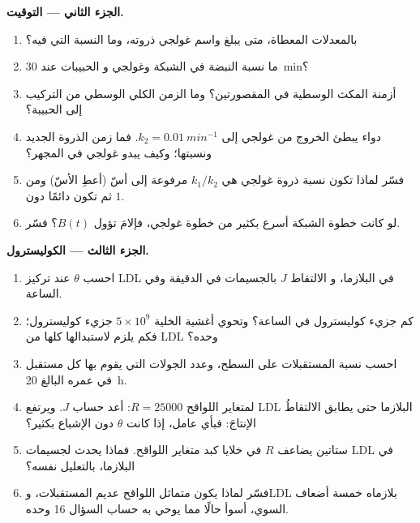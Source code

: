 \begin{problem}
\medskip
\noindent\textbf{الجزء الثاني --- التوقيت.}
\begin{enumerate}[resume]
  \item بالمعدلات المعطاة، متى يبلغ واسم غولجي ذروته، وما
        النسبة التي فيه؟
  \item ما نسبة النبضة في الشبكة وغولجي و
        الحبيبات عند \qty{30}{min}؟
  \item أزمنة المكث الوسطية في المقصورتين؟ وما الزمن الكلي
        الوسطي من التركيب إلى الحبيبة؟
  \item دواء يبطئ الخروج من غولجي إلى $k_{2} = \qty{0.01}{min^{-1}}$.
        فما زمن الذروة الجديد ونسبتها؛ وكيف يبدو غولجي
        في المجهر؟
  \item فسّر لماذا تكون نسبة ذروة غولجي هي $k_{1}/k_{2}$ مرفوعة إلى
        أسّ (أعطِ الأسّ) ومن ثم تكون دائمًا دون $1$.
  \item لو كانت خطوة الشبكة أسرع بكثير من خطوة غولجي،
        فإلامَ تؤول $B(t)$؟ فسّر.
\end{enumerate}

\medskip
\noindent\textbf{الجزء الثالث --- الكوليسترول.}
\begin{enumerate}[resume]
  \item احسب $\theta$ عند تركيز LDL في البلازما، و
        الالتقاط $J$ بالجسيمات في الدقيقة وفي الساعة.
  \item كم جزيء كوليسترول في الساعة؟ وتحوي أغشية الخلية
        $5\times 10^{9}$ جزيء كوليسترول؛ فكم يلزم لاستبدالها
        كلها من LDL وحده؟
  \item احسب نسبة المستقبلات على السطح، وعدد
        الجولات التي يقوم بها كل مستقبل في عمره البالغ \qty{20}{h}.
  \item لمتغاير اللواقح $R = \num{25000}$: أعد حساب $J$. ويرتفع LDL
        البلازما حتى يطابق الالتقاطُ الإنتاجَ: فبأي عامل، إذا كانت
        $\theta$ دون الإشباع بكثير؟
  \item ستاتين يضاعف $R$ في خلايا كبد متغاير اللواقح. فماذا
        يحدث لجسيمات LDL في البلازما، بالتعليل نفسه؟
  \item فسّر لماذا يكون متماثل اللواقح عديم المستقبلات، وLDL بلازماه
        خمسة أضعاف السوي، أسوأ حالًا مما يوحي به حساب السؤال
        16 وحده.
\end{enumerate}


\end{problem}
